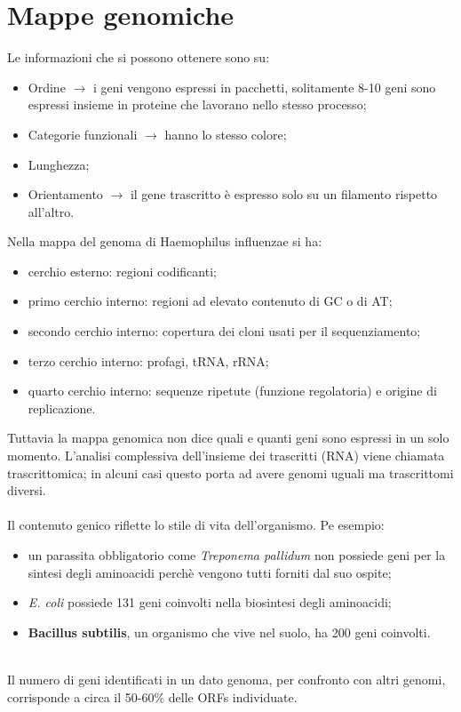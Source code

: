 \section{Mappe genomiche}
Le informazioni che si possono ottenere sono su: 
\begin{itemize}
    \item Ordine $\xrightarrow{}$ i geni vengono espressi in pacchetti, solitamente 8-10 geni sono espressi insieme in proteine che lavorano nello stesso processo;
    \item Categorie funzionali $\xrightarrow{}$ hanno lo stesso colore;
    \item Lunghezza;
    \item Orientamento $\xrightarrow{}$ il gene trascritto \`e espresso solo su un filamento rispetto all'altro.
\end{itemize}
Nella mappa del genoma di Haemophilus influenzae si ha:
\begin{itemize}
    \item cerchio esterno: regioni codificanti;
    \item primo cerchio interno: regioni ad elevato contenuto di GC o di AT;
    \item secondo cerchio interno: copertura dei cloni usati per il sequenziamento;
    \item terzo cerchio interno: profagi, tRNA, rRNA;
    \item quarto cerchio interno: sequenze ripetute (funzione regolatoria) e origine di replicazione.
\end{itemize}
Tuttavia la mappa genomica non dice quali e quanti geni sono espressi in un solo momento. L'analisi complessiva dell'insieme dei trascritti (RNA) viene chiamata trascrittomica; in alcuni casi questo porta ad avere genomi uguali ma trascrittomi diversi. 
\\\\Il contenuto genico riflette lo stile di vita dell'organismo. Pe esempio:
\begin{itemize}
    \item un parassita obbligatorio come \textit{Treponema pallidum} non possiede geni per la sintesi degli aminoacidi perch\`e vengono tutti forniti dal suo ospite;
    \item \textit{E. coli} possiede 131 geni coinvolti nella biosintesi degli aminoacidi;
    \item \textbf{Bacillus subtilis}, un organismo che vive nel suolo, ha 200 geni coinvolti.
\end{itemize}
\\Il numero di geni identificati in un dato genoma, per confronto con altri genomi, corrisponde a circa il 50-60$\%$ delle ORFs individuate.
